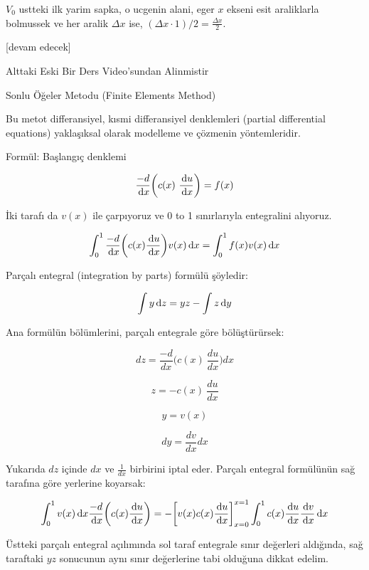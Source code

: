 \documentclass[12pt,fleqn]{article}\usepackage{../../common}
\begin{document}
$V_0$ ustteki ilk yarim sapka, o ucgenin alani, eger $x$ ekseni esit araliklarla
bolmussek ve her aralik $\Delta x$ ise,
$(\Delta x \cdot 1) / 2 = \frac{\Delta x}{2}$.

















[devam edecek]


Alttaki Eski Bir Ders Video'sundan Alinmistir

Sonlu Öğeler Metodu (Finite Elements Method)

Bu metot differansiyel, kısmi differansiyel denklemleri (partial differential
equations) yaklaşıksal olarak modelleme ve çözmenin yöntemleridir.

Formül: Başlangıç denklemi

$$ \frac{-d}{\,\mathrm{d} x} \bigg( c(x) \ \frac{\,\mathrm{d} u}{\,\mathrm{d} x} \bigg) = f(x) $$

İki tarafı da  $v(x)$ ile çarpıyoruz ve 0 to 1 sınırlarıyla entegralini alıyoruz.

$$
\int_0^1 \frac{-d}{\,\mathrm{d} x} \bigg( c(x) \frac{\,\mathrm{d} u}{\,\mathrm{d} x} \bigg) v(x)\,\mathrm{d} x
= \int_0^1 f(x)v(x) \,\mathrm{d} x
$$

Parçalı entegral (integration by parts) formülü şöyledir:

$$ \int y \,\mathrm{d} z = y  z - \int z \,\mathrm{d} y $$

Ana formülün bölümlerini, parçalı entegrale göre bölüştürürsek:

$$ dz = \frac{-d}{dx} \bigg( c(x) \ \frac{du}{dx} \bigg) dx  $$

$$ z = - c(x) \ \frac{du}{dx}  $$

$$ y = v(x)  $$

$$ dy = \frac{dv}{dx}dx $$

Yukarıda $dz$ içinde $dx$ ve $\frac{1}{dx}$ birbirini iptal eder. Parçalı
entegral formülünün sağ tarafına göre yerlerine koyarsak:

$$
\int_0^1 v(x)\,\mathrm{d} x \frac{-d}{\,\mathrm{d} x} \bigg( c(x) \frac{\,\mathrm{d} u}{\,\mathrm{d} x} \bigg)
= - \bigg[ v(x) c(x) \frac{\,\mathrm{d} u}{\,\mathrm{d} x} \bigg]_{x=0}^{x=1} \int_0^1 c(x) \frac{\,\mathrm{d} u}{\,\mathrm{d} x} \frac{\,\mathrm{d} v}{\,\mathrm{d} x} \,\mathrm{d} x
$$

Üstteki parçalı entegral açılımında sol taraf entegrale sınır
değerleri aldığında, sağ taraftaki $yz$ sonucunun aynı sınır
değerlerine tabi olduğuna dikkat edelim.
\end{document}
